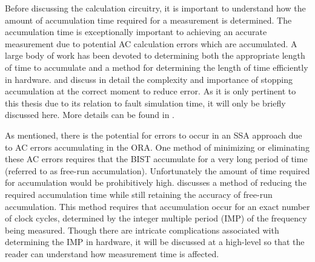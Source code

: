 \documentclass[12pt]{report}
\begin{document}
Before discussing the calculation circuitry, it is important to understand how the amount of accumulation time required for a measurement is determined.  The accumulation time is exceptionally important to achieving an accurate measurement due to potential AC calculation errors which are accumulated\cite{jie}.  A large body of work has been devoted to determining both the appropriate length of time to accumulate and a method for determining the length of time efficiently in hardware.  \cite{jie} and \cite{testtime} discuss in detail the complexity and importance of stopping accumulation at the correct moment to reduce error.  As it is only pertinent to this thesis due to its relation to fault simulation time, it will only be briefly discussed here.  More details can be found in \cite{jie}.

As mentioned, there is the potential for errors to occur in an SSA approach due to AC errors accumulating in the ORA\cite{jie}.  One method of minimizing or eliminating these AC errors requires that the BIST accumulate for a very long period of time (referred to as free-run accumulation).  Unfortunately the amount of time required for accumulation would be prohibitively high\cite{testtime}.  \cite{jie} discusses a method of reducing the required accumulation time while still retaining the accuracy of free-run accumulation.  This method requires that accumulation occur for an exact number of clock cycles, determined by the integer multiple period (IMP) of the frequency being measured.  Though there are intricate complications associated with determining the IMP in hardware, it will be discussed at a high-level so that the reader can understand how measurement time is affected.
\end{document}
